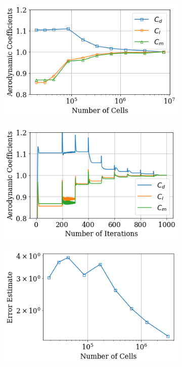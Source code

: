 						
						\begin{figure}
							\begin{subfigure}{.5\textwidth}
								\centering
								\includegraphics[width=0.99\linewidth]{figures/3_vehicle_design/CartCoeffs_cells}
								\caption{}
							\end{subfigure}
							\begin{subfigure}{.5\textwidth}
								\centering
								\includegraphics[width=0.99\linewidth]{figures/3_vehicle_design/CartCoeffs_its}
								\caption{}
								
							\end{subfigure}
							\begin{subfigure}{.5\textwidth}
								\centering
								\includegraphics[width=0.9\linewidth]{figures/3_vehicle_design/ErrorEst}
								\caption{}
								

\end{subfigure}
\end{figure}
